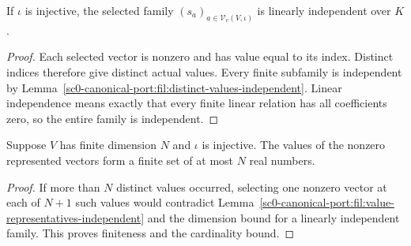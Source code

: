 \begin{lemma}
\label{sc0-canonical-port:fil:value-representatives-independent}
\leanok
If \(\iota\) is injective, the selected family \((s_a)_{a\in\mathcal V_v(V,\iota)}\)
is linearly independent over \(K\).
\end{lemma}
\begin{proof}
Each selected vector is nonzero and has value equal to its index.
Distinct indices therefore give distinct actual values. Every finite
subfamily is independent by Lemma~\ref{sc0-canonical-port:fil:distinct-values-independent}.
Linear independence means exactly that every finite linear relation
has all coefficients zero, so the entire family is independent.
\end{proof}

\begin{lemma}
\label{sc0-canonical-port:fil:finite-jumping-values}
\leanok
Suppose \(V\) has finite dimension \(N\) and \(\iota\) is injective.
The values of the nonzero represented vectors form a finite set of
at most \(N\) real numbers.
\end{lemma}
\begin{proof}
If more than \(N\) distinct values occurred, selecting one nonzero
vector at each of \(N+1\) such values would contradict
Lemma~\ref{sc0-canonical-port:fil:value-representatives-independent} and the dimension
bound for a linearly independent family. This proves finiteness
and the cardinality bound.
\end{proof}

